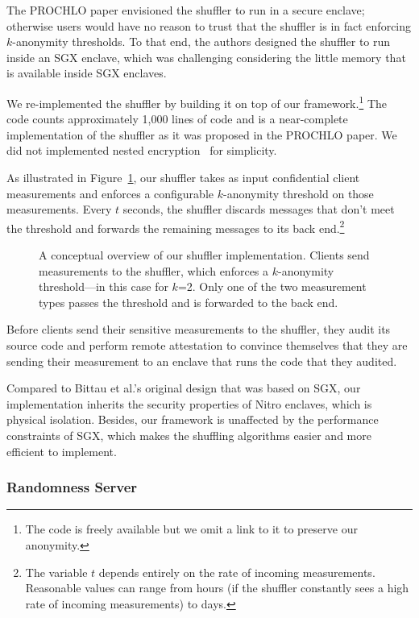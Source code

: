 The PROCHLO paper envisioned the shuffler to run in a secure enclave; otherwise users would have no reason to trust that the shuffler is in fact enforcing $k$-anonymity thresholds.  To that end, the authors designed the shuffler to run inside an SGX enclave, which was challenging considering the little memory that is available inside SGX enclaves.

We re-implemented the shuffler by building it on top of our framework.\footnote{The code is freely available but we omit a link to it to preserve our anonymity.}  The code counts approximately 1,000 lines of code and is a near-complete implementation of the shuffler as it was proposed in the PROCHLO paper.  We did not implemented nested encryption~\cite[\S~3]{Bittau2017a} for simplicity.

As illustrated in Figure~\ref{fig:shuffler}, our shuffler takes as input confidential client measurements and enforces a configurable $k$-anonymity threshold on those measurements.  Every $t$ seconds, the shuffler discards messages that don't meet the threshold and forwards the remaining messages to its back end.\footnote{The variable $t$ depends entirely on the rate of incoming measurements.  Reasonable values can range from hours (if the shuffler constantly sees a high rate of incoming measurements) to days.}

\begin{figure}[t]
\centering

\caption{A conceptual overview of our shuffler implementation.  Clients send measurements to the shuffler, which enforces a $k$-anonymity threshold---in this case for $k$=2. Only one of the two measurement types passes the threshold and is forwarded to the back end.}
\label{fig:shuffler}
\end{figure}

Before clients send their sensitive measurements to the shuffler, they audit its source code and perform remote attestation to convince themselves that they are sending their measurement to an enclave that runs the code that they audited.

Compared to Bittau et al.'s original design that was based on SGX, our implementation inherits the security properties of Nitro enclaves, which is physical isolation.  Besides, our framework is unaffected by the performance constraints of SGX, which makes the shuffling algorithms easier and more efficient to implement.

\subsubsection{Randomness Server}
\label{sec:randomness}

